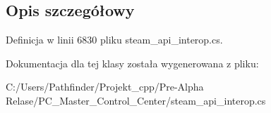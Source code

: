 \subsection{Opis szczegółowy}


Definicja w linii 6830 pliku steam\+\_\+api\+\_\+interop.\+cs.



Dokumentacja dla tej klasy została wygenerowana z pliku\+:\begin{DoxyCompactItemize}
\item 
C\+:/\+Users/\+Pathfinder/\+Projekt\+\_\+cpp/\+Pre-\/\+Alpha Relase/\+P\+C\+\_\+\+Master\+\_\+\+Control\+\_\+\+Center/steam\+\_\+api\+\_\+interop.\+cs\end{DoxyCompactItemize}
